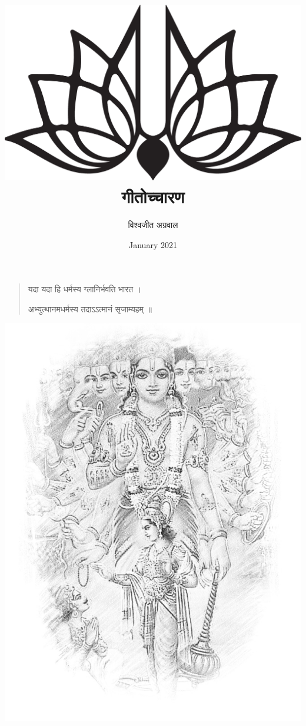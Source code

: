 \title{
	\includegraphics[scale=0.2,keepaspectratio]{eps5black}\\
	\sanskrit गीतोच्चारण}
\author{\sanskrit विश्वजीत अग्रवाल}
\date{January 2021}
\maketitle
\begin{quotation}
	\begin{center}\sanskrit
	यदा यदा हि धर्मस्य ग्लानिर्भवति भारत  । 
	
	अभ्युत्थानमधर्मस्य तदाऽऽत्मानं सृजाम्यहम्  ॥ 
\end{center}
\end{quotation}
\begin{center}
	\includegraphics[scale=0.35,keepaspectratio]{CoverImage.jpg}
\end{center}
